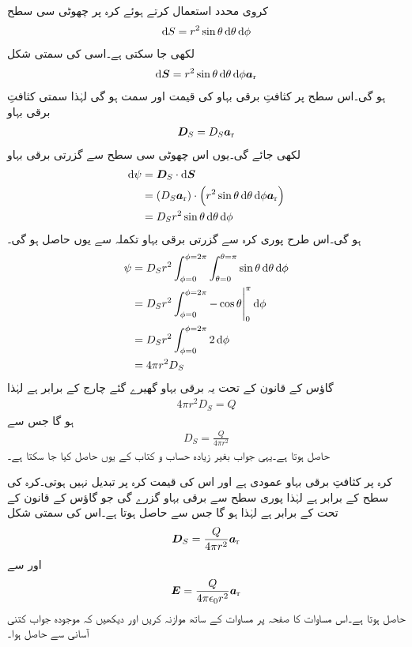 کروی محدد استعمال کرتے ہوئے کرہ پر چھوٹی سی سطح
\begin{align*}
\dif S=r^2 \sin \theta \dif \theta \dif \phi
\end{align*}
لکھی جا سکتی ہے۔اسی کی سمتی شکل
\begin{align*}
\dif \kvec{S}=r^2 \sin \theta \dif \theta \dif \phi \ar
\end{align*}
ہو گی۔اس سطح پر کثافتِ برقی بہاو کی قیمت  اور سمت  ہو گی لہٰذا سمتی کثافتِ برقی بہاو 
\begin{align*}
{\ensuremath{{\boldsymbol{D}}}}_S=D_S {\boldsymbol{a}}_{\textup{r}}
\end{align*}
لکھی جائے گی۔یوں اس چھوٹی سی سطح سے گزرتی برقی بہاو
\begin{align*}
\dif \psi&=\kvec{D}_S \cdot \dif \kvec{S}\\
&=\left( D_S \ar \right) \cdot \left(r^2 \sin \theta \dif \theta \dif \phi \ar \right)\\
&= D_S r^2 \sin \theta \dif \theta \dif \phi
\end{align*}
ہو  گی۔اس طرح پوری کرہ سے گزرتی برقی بہاو تکملہ سے یوں حاصل ہو گی۔
\begin{align*}
\psi&=D_S r^2  \int_{\phi=0}^{\phi=2\pi}\int_{\theta=0}^{\theta=\pi} \sin \theta \dif \theta \dif \phi\\
&=D_S r^2 \int_{\phi=0}^{\phi=2\pi} \eval{-\cos \theta}_0^{\pi} \dif \phi\\
&=D_S r^2 \int_{\phi=0}^{\phi=2\pi} 2 \dif \phi\\
&=4 \pi r^2 D_S
\end{align*}
گاؤس کے قانون کے تحت یہ برقی بہاو گھیرے گئے چارج  کے برابر ہے لہٰذا
\begin{align*}
4 \pi r^2 D_S=Q
\end{align*}
ہو گا جس سے
\begin{align*}
D_S=\frac{Q}{4 \pi r^2}
\end{align*}
حاصل ہوتا ہے۔یہی جواب بغیر زیادہ حساب و کتاب کے یوں حاصل کیا جا سکتا ہے۔

کرہ پر کثافتِ برقی بہاو  عمودی ہے اور اس کی قیمت کرہ پر تبدیل نہیں ہوتی۔کرہ کی سطح  کے برابر ہے لہٰذا پوری سطح سے  برقی بہاو گزرے گی جو گاؤس کے قانون کے تحت  کے برابر ہے لہٰذا  ہو گا جس سے  حاصل ہوتا ہے۔اس کی سمتی شکل
\begin{align}
{\ensuremath{{\boldsymbol{D}}}}_S=\frac{Q}{4\pi r^2} {\boldsymbol{a}}_{\textup{r}}
\end{align}
اور  سے
\begin{align}
{\ensuremath{{\boldsymbol{E}}}}=\frac{Q}{4\pi \epsilon_0 r^2} {\boldsymbol{a}}_{\textup{r}}
\end{align}
حاصل ہوتا ہے۔اس مساوات کا صفحہ  پر مساوات  کے ساتھ موازنہ کریں اور دیکھیں کہ موجودہ جواب کتنی آسانی سے حاصل ہوا۔

